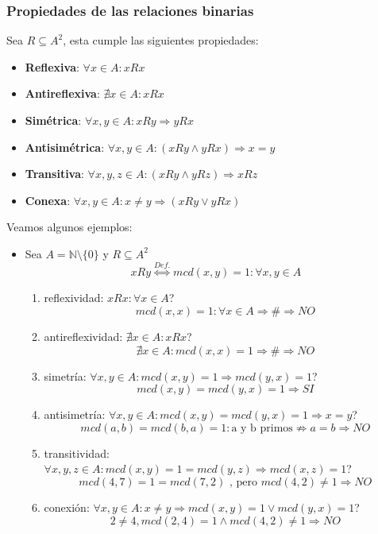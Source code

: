 \documentclass[10pt,a4paper,openright]{book}
\begin{document}
\subsubsection*{Propiedades de las relaciones binarias}
Sea $R\subseteq A^2$, esta cumple las siguientes propiedades:
\begin{itemize}
\item \textbf{Reflexiva}: $\forall x \in A: xRx$
\item \textbf{Antireflexiva}: $\nexists x\in A: xRx$
\item \textbf{Simétrica}: $\forall x,y \in A: xRy\Rightarrow yRx$
\item \textbf{Antisimétrica}: $\forall x,y \in A: (xRy\wedge yRx)\Rightarrow x=y$
\item \textbf{Transitiva}: $\forall x,y,z \in A: (xRy\wedge yRz)\Rightarrow xRz$
\item \textbf{Conexa}: $\forall x,y\in A: x\neq y\Rightarrow (xRy\vee yRx)$
\end{itemize}

Veamos algunos ejemplos:
\begin{itemize}
\item Sea $A=\mathbb N\mbox{\textbackslash}\{0\}$ y $R\subseteq A^2$
$$xRy\stackrel{Def.}{\Leftrightarrow} mcd(x,y)=1: \forall x,y\in A$$
	\begin{enumerate}
	\item reflexividad: $xRx: \forall x \in A$?
	$$mcd(x,x)=1: \forall x\in A\Rightarrow \#\Rightarrow NO$$
	\item antireflexividad: $\nexists x\in A: xRx$?
	$$\nexists x\in A: mcd(x,x)=1\Rightarrow \# \Rightarrow NO$$
	\item simetría: $\forall x,y \in A: mcd(x,y)=1\Rightarrow mcd(y,x)=1$?
	$$mcd(x,y)=mcd(y,x)=1\Rightarrow SI$$
	\item antisimetría: $\forall x,y \in A: mcd(x,y)=mcd(y,x)=1\Rightarrow x=y$?
	$$mcd(a,b)=mcd(b,a)=1: \mbox{a y b primos}\nRightarrow a=b\Rightarrow NO$$
	\item transitividad: $\forall x,y,z \in A: mcd(x,y)=1=mcd(y,z)\Rightarrow mcd(x,z)=1$?
	$$mcd(4,7)=1=mcd(7,2)\mbox{ , pero }mcd(4,2)\neq 1\Rightarrow NO$$
	\item conexión: $\forall x,y \in A: x\neq y\Rightarrow mcd(x,y)=1 \vee mcd(y,x)=1$?
	$$2\neq 4, mcd(2,4)=1\wedge mcd(4,2)\neq 1\Rightarrow NO$$
	\end{enumerate}
\end{itemize}
\end{document}
